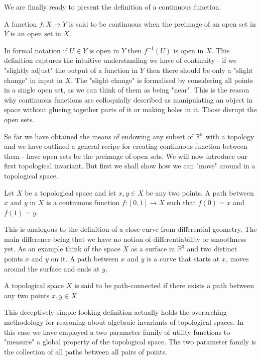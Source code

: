 We are finally ready to present the definition of a continuous function. 

\begin{defn} A function $f : X \to Y$ is said to be continuous when the preimage of an open set in $Y$ is an open set in $X$. \end{defn}

In formal notation if $U \in Y$ is open in $Y$ then $f^{-1}(U)$ is open in $X$. This definition captures the intuitive understanding we have of continuity - if we "slightly adjust" the output of a function in $Y$ then there should be only a "slight change" in input in $X$. The "slight change" is formalised by considering all points in a single open set, as we can think of them as being "near". This is the reason why continuous functions are colloquially described as manipulating an object in space without glueing together parts of it or making holes in it. Those disrupt the open sets.

So far we have obtained the means of endowing any subset of $\mathbb{R}^n$ with a topology and we have outlined a general recipe for creating continuous function between them - have open sets be the preimage of open sets. We will now introduce our first topological invariant. But first we shall show how we can "move" around in a topological space. 

\begin{defn} Let $X$ be a topological space and let $x, y \in X$ be any two points. A path between $x$ and $y$ in $X$ is a continuous function $f: [0, 1] \to X$ such that $f(0) = x$ and $f(1) = y$.  \end{defn}

    This is analogous to the definition of a close curve from differential geometry. The main difference being that we have no notion of differentiability or smoothness yet. As an example think of the space $X$ as a surface in $\mathbb{R}^3$ and two distinct points $x$ and $y$ on it. A path between $x$ and $y$ is a curve that starts at $x$, moves around the surface and ends at $y$.

\begin{defn} A topological space $X$ is said to be path-connected if there exists a path between any two points $x, y \in X$  \end{defn}


This deceptively simple looking definition actually holds the overarching methodology for reasoning about algebraic invariants of topological spaces. In this case we have employed a two parameter family of utility functions to "measure" a global property of the topological space. The two parameter family is the collection of all paths between all pairs of points.

